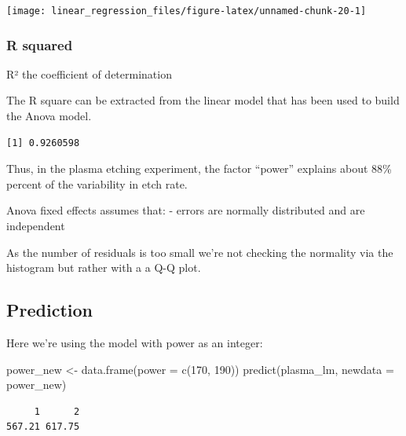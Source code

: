 \documentclass[
]{book}
\newenvironment{Shaded}{\begin{snugshade}}{\end{snugshade}}
\newcommand{\AttributeTok}[1]{\textcolor[rgb]{0.77,0.63,0.00}{#1}}
\newcommand{\DecValTok}[1]{\textcolor[rgb]{0.00,0.00,0.81}{#1}}
\newcommand{\FunctionTok}[1]{\textcolor[rgb]{0.00,0.00,0.00}{#1}}
\newcommand{\NormalTok}[1]{#1}
\newcommand{\OtherTok}[1]{\textcolor[rgb]{0.56,0.35,0.01}{#1}}
\newcommand{\SpecialCharTok}[1]{\textcolor[rgb]{0.00,0.00,0.00}{#1}}
\begin{document}
\texttt{[image: linear\_regression\_files/figure-latex/unnamed-chunk-20-1]}

\hypertarget{r-squared}{%
\subsubsection{R squared}\label{r-squared}}

R² the coefficient of determination

The R square can be extracted from the linear model that has been used to build the Anova model.

\begin{Shaded}
\end{Shaded}

\begin{verbatim}
[1] 0.9260598
\end{verbatim}

Thus, in the plasma etching experiment, the factor ``power'' explains about 88\% percent of the variability in etch rate.

Anova fixed effects assumes that:
- errors are normally distributed and are independent

As the number of residuals is too small we're not checking the normality via the histogram but rather with a a Q-Q plot.

\hypertarget{predict}{%
\subsection{Prediction}\label{predict}}

Here we're using the model with power as an integer:

\begin{Shaded}
\begin{Highlighting}[]
\NormalTok{power\_new }\OtherTok{\textless{}{-}} \FunctionTok{data.frame}\NormalTok{(}\AttributeTok{power =} \FunctionTok{c}\NormalTok{(}\DecValTok{170}\NormalTok{, }\DecValTok{190}\NormalTok{))}
\FunctionTok{predict}\NormalTok{(plasma\_lm, }\AttributeTok{newdata =}\NormalTok{ power\_new)}
\end{Highlighting}
\end{Shaded}

\begin{verbatim}
     1      2 
567.21 617.75 
\end{verbatim}
\end{document}
